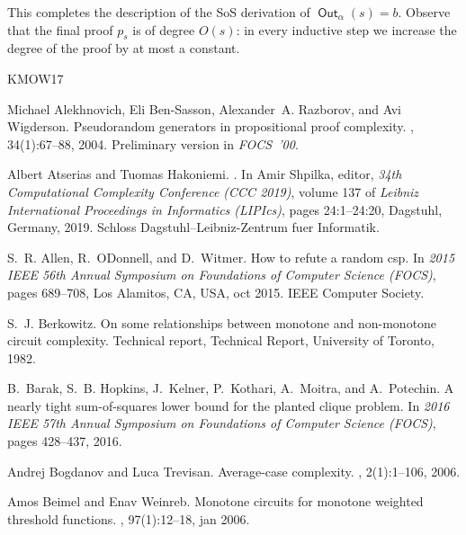 \documentclass[10pt,a4paper]{article}
\theoremstyle{plain}
\theoremstyle{remark}
\theoremstyle{definition}
\newcommand{\vars}[1]{\mathsf{#1}}
\DeclareMathOperator{\outwire}{\vars{Out}}
\begin{document}
This completes the description of the SoS derivation of
$\outwire_\alpha(s) = b$.
%
Observe that the final proof $p_s$ is of degree $O(s)$: in every
inductive step we increase the degree of the proof by at most a
constant.

\newcommand{\etalchar}[1]{$^{#1}$}
\begin{thebibliography}{KMOW17}

Michael Alekhnovich, Eli {Ben-Sasson}, Alexander~A. Razborov, and Avi
  Wigderson.
\newblock Pseudorandom generators in propositional proof complexity.
, 34(1):67\nobreakdash--88, 2004.
\newblock Preliminary version in \emph{FOCS~'00}.

Albert Atserias and Tuomas Hakoniemi.
.
\newblock In Amir Shpilka, editor, {\em 34th Computational Complexity
  Conference (CCC 2019)}, volume 137 of {\em Leibniz International Proceedings
  in Informatics (LIPIcs)}, pages 24:1--24:20, Dagstuhl, Germany, 2019. Schloss
  Dagstuhl--Leibniz-Zentrum fuer Informatik.

S.~R. Allen, R.~ODonnell, and D.~Witmer.
\newblock How to refute a random csp.
\newblock In {\em 2015 IEEE 56th Annual Symposium on Foundations of Computer
  Science (FOCS)}, pages 689--708, Los Alamitos, CA, USA, oct 2015. IEEE
  Computer Society.

S.~J. Berkowitz.
\newblock On some relationships between monotone and non-monotone circuit
  complexity.
\newblock Technical report, Technical Report, University of Toronto, 1982.

\bibitem[BHK{\etalchar{+}}16]{BHKKMP16clique}
B.~{Barak}, S.~B. {Hopkins}, J.~{Kelner}, P.~{Kothari}, A.~{Moitra}, and
  A.~{Potechin}.
\newblock A nearly tight sum-of-squares lower bound for the planted clique
  problem.
\newblock In {\em 2016 IEEE 57th Annual Symposium on Foundations of Computer
  Science (FOCS)}, pages 428--437, 2016.

Andrej Bogdanov and Luca Trevisan.
\newblock Average-case complexity.
,
  2(1):1--106, 2006.

Amos Beimel and Enav Weinreb.
\newblock Monotone circuits for monotone weighted threshold functions.
, 97(1):12–18, jan 2006.


\end{thebibliography}
\end{document}
